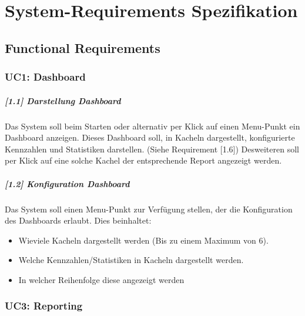 \documentclass[a4paper]{scrreprt}
\begin{document}
\chapter{System-Requirements Spezifikation}

\section{Functional Requirements}
\subsection{UC1: Dashboard}
\paragraph{[1.1] Darstellung Dashboard}
Das System soll beim Starten oder alternativ per Klick auf einen Menu-Punkt ein Dashboard anzeigen. Dieses Dashboard soll, in Kacheln dargestellt, konfigurierte Kennzahlen und Statistiken darstellen. (Siehe Requirement [1.6]) Desweiteren soll per Klick auf eine solche Kachel der entsprechende Report angezeigt werden. 
 	
\paragraph{[1.2] Konfiguration Dashboard}
Das System soll einen Menu-Punkt zur Verfügung stellen, der die Konfiguration des Dashboards erlaubt. Dies beinhaltet: 
\begin{itemize}
\item Wieviele Kacheln dargestellt werden (Bis zu einem Maximum von 6).
\item Welche Kennzahlen/Statistiken in Kacheln dargestellt werden.
\item In welcher Reihenfolge diese angezeigt werden
\end{itemize}

\subsection{UC3: Reporting}
\end{document}
